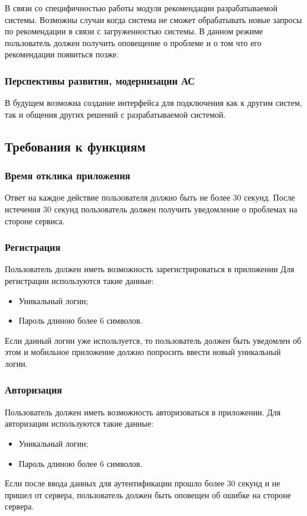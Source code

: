 В связи со специфичностью работы модуля рекомендации разрабатываемой системы.
Возможны случаи когда система не сможет обрабатывать новые запросы по рекомендации в связи с загруженностью системы.
В данном режиме пользователь должен получить оповещение о проблеме и о том что его рекомендации появиться позже.

\subsubsection{Перспективы развития, модернизации АС}
В будущем возможна создание интерфейса для подключения как к другим систем, так и общения других решений с
разрабатываемой системой.

\subsection{Требования к функциям}\label{subsec:func:treb}

\subsubsection{Время отклика приложения}
Ответ на каждое действие пользователя должно быть не более 30 секунд.
После истечения 30 секунд пользователь должен получить уведомление о проблемах на стороне сервиса.

\subsubsection{Регистрация}
Пользователь должен иметь возможность зарегистрироваться в приложении
Для регистрации используются такие данные:
\begin{itemize}
    \item Уникальный логин;
    \item Пароль длиною более 6 символов.
\end{itemize}
Если данный логин уже используется, то пользователь должен быть уведомлен об этом и мобильное приложение должно
попросить ввести новый уникальный логин.

\subsubsection{Авторизация}
Пользователь должен иметь возможность авторизоваться в приложении.
Для авторизации используются такие данные:
\begin{itemize}
    \item Уникальный логин;
    \item Пароль длиною более 6 символов.
\end{itemize}
Если после ввода данных для аутентификации прошло более 30 секунд и не пришел от сервера, пользователь должен быть
оповещен об ошибке на стороне сервера.

